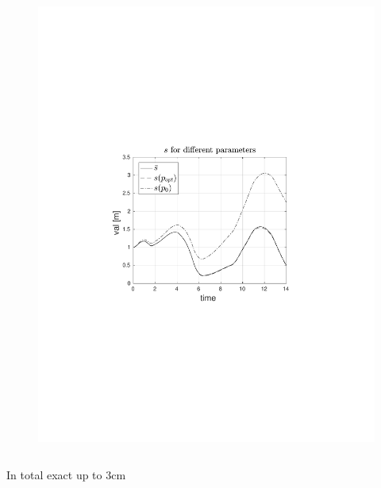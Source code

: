 \begin{frame}
\begin{columns}[t]
\begin{figure}
                \includegraphics[trim=4cm 9cm 4cm 8.5cm, clip=true, width=\linewidth]{img/convPlotTrajS}
            \end{figure}
    \end{columns}

    \begin{center}
        In total exact up to $3\text{cm}$
    \end{center}
\end{frame}

